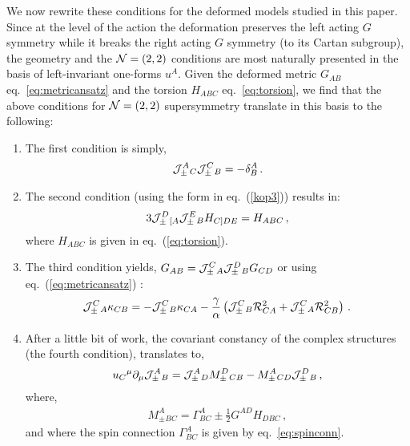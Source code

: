 \documentclass[12pt]{article}
\def\N{{\cal N}}
\def\J{{\cal J}}
\def\R{{\mathbb R}}
\renewcommand{\R}{\mathcal{R}}
\begin{document}
We now rewrite these conditions for the deformed models studied in this paper. Since at the level of the action the deformation preserves the left acting $G$ symmetry while it breaks the right acting $G$ symmetry (to its Cartan subgroup), the geometry and the $\N=(2,2)$ conditions are most naturally presented in the basis of left-invariant one-forms $u^{A}$. Given the deformed metric $G_{AB}$ eq.~\eqref{eq:metricansatz} and the torsion $H_{ABC}$ eq.~\eqref{eq:torsion}, we find that the above conditions for $\N=(2,2)$ supersymmetry translate in this basis to the following:
\begin{enumerate}
\item The first condition is simply,
\begin{eqnarray}
\J_{\pm}^{A}{}_C \J_{\pm}^{C}{}_B = -\delta^{A}_B\,.\label{fd1}
\end{eqnarray} 
\item The second condition (using the form in eq.~(\ref{kop3}))  results in:
\begin{eqnarray}
3{\cal  J}_\pm^D{}_{[A} {\cal  J}_\pm^E{}_{B}H_{C]DE}=H_{ABC}\,,\label{fd7}
\end{eqnarray} 
where $H_{ABC}$ is given in eq.~(\ref{eq:torsion}). 
\item The third condition yields, $G_{AB} = \J_{\pm}^{C}{}_A \J_{\pm}^{D}{}_B G_{CD}$ or using eq.~(\ref{eq:metricansatz}) :
\begin{equation}
\J_\pm^{C}{}_A \kappa_{CB} = -\J_\pm^{C}{}_B \kappa_{CA} - \frac{\gamma}{\alpha} \left(\J_\pm^{C}{}_B \R^{2}_{CA} + \J_\pm^{C}{}_A  \R^{2}_{CB} \right)\,.\label{fd3}
\end{equation}
\item After a little bit of work, the covariant constancy of the complex structures (the fourth condition), translates to,
\begin{equation}
u_C{}^{\mu}\partial_\mu \J_{\pm}^{A}{}_B =  \J_{\pm}^{A}{}_DM^D_\pm{}_{CB} - M^A_\pm{}_{CD}\J_{\pm}^{D}{}_B\,,\label{fd4}
\end{equation}
where,
\begin{eqnarray}
M^A_\pm{}_{BC}=\Gamma^{A}_{BC} \pm  \frac{1}{2}G^{AD}H_{DBC}\,,\label{conner}
\end{eqnarray} 
and where the spin connection $\Gamma^{A}_{BC}$ is given by eq.~\eqref{eq:spinconn}. 

\end{enumerate}
\end{document}
